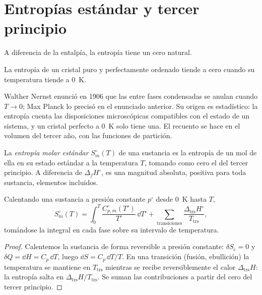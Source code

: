 \section{Entropías estándar y tercer principio}

A diferencia de la entalpía, la entropía tiene un cero natural.

\begin{theorem}\label{thm:b2:reaction-free-energy:third-law}
La entropía de un cristal puro y perfectamente ordenado tiende a cero cuando su
temperatura tiende a \qty{0}{K}.
\end{theorem}
\admitted

\begin{remark}\label{rem:b2:reaction-free-energy:third-law}
Walther Nernst enunció en 1906 que las  entre fases
condensadas se anulan cuando $T \to 0$; Max Planck lo precisó en el enunciado
anterior. Su origen es estadístico: la entropía cuenta las disposiciones
microscópicas compatibles con el estado de un sistema, y un cristal perfecto
a \qty{0}{K} solo tiene una. El recuento se hace en el volumen del tercer año,
con las funciones de partición.
\end{remark}

\begin{definition}\label{def:b2:reaction-free-energy:standard-entropy}
La \emph{entropía molar estándar}
$S^\circ_m(T)$ de una sustancia es la entropía de un mol de ella en su
estado estándar a la temperatura $T$, tomando como cero el del tercer principio.
A diferencia de $\Delta_f H^\circ$, es una magnitud absoluta, positiva para toda
sustancia, elementos incluidos.
\end{definition}

\begin{proposition}\label{prop:b2:reaction-free-energy:absolute-entropy}
Calentando una sustancia a presión constante $p^\circ$ desde \qty{0}{K} hasta $T$,
\[
  S^\circ_m(T) = \int_0^T\frac{C^\circ_{p,m}(T')}{T'}\,\dd T' +
  \sum_{\text{transiciones}}\frac{\Delta_{\text{trs}}H^\circ}{T_{\text{trs}}} ,
\]
tomándose la integral en cada fase sobre su intervalo de temperatura.
\end{proposition}

\begin{proof}
Calentemos la sustancia de forma reversible a presión constante: $\delta S_{\text{c}} =
0$ y $\delta Q = \dd H = C_p\,\dd T$, luego $\dd S = C_p\,\dd T/T$. En una
transición (fusión, ebullición) la temperatura se mantiene en $T_{\text{trs}}$
mientras se recibe reversiblemente el calor $\Delta_{\text{trs}}H$: la entropía
salta en $\Delta_{\text{trs}}H/T_{\text{trs}}$. Se suman las contribuciones a partir del
cero del tercer principio.
\end{proof}

